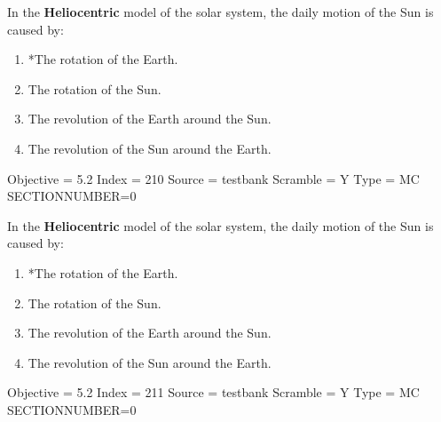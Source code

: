\documentclass[11pt]{article}
\begin{document}
\begin{enumerate}
\begin{minipage}{\textwidth}
\begin{minipage}{\textwidth}
\item In the {\bf Heliocentric} model of the solar system, the daily motion of the Sun is caused by:
\begin{enumerate} 
\setlength{\itemsep}{1pt} 
\setlength{\parskip}{0pt} 
\setlength{\parsep}{0pt}
\setlength{\multicolsep}{1pt} 
\item *The rotation of the Earth.
\item The rotation of the Sun.
\item The revolution of the Earth around the Sun.
\item The revolution of the Sun around the Earth.
\end{enumerate} 
Objective = 5.2
Index = 210
Source = testbank
Scramble = Y
Type = MC
SECTIONNUMBER=0
\end{minipage}
\end{minipage}
\vskip 0.20in

\begin{minipage}{\textwidth}
\begin{minipage}{\textwidth}
\item In the {\bf Heliocentric} model of the solar system, the daily motion of the Sun is caused by:
\begin{enumerate} 
\setlength{\itemsep}{1pt} 
\setlength{\parskip}{0pt} 
\setlength{\parsep}{0pt}
\setlength{\multicolsep}{1pt} 
\item *The rotation of the Earth.
\item The rotation of the Sun.
\item The revolution of the Earth around the Sun.
\item The revolution of the Sun around the Earth.
\end{enumerate} 
Objective = 5.2
Index = 211
Source = testbank
Scramble = Y
Type = MC
SECTIONNUMBER=0
\end{minipage}
\end{minipage}
\vskip 0.20in


\end{enumerate}
\end{document}
